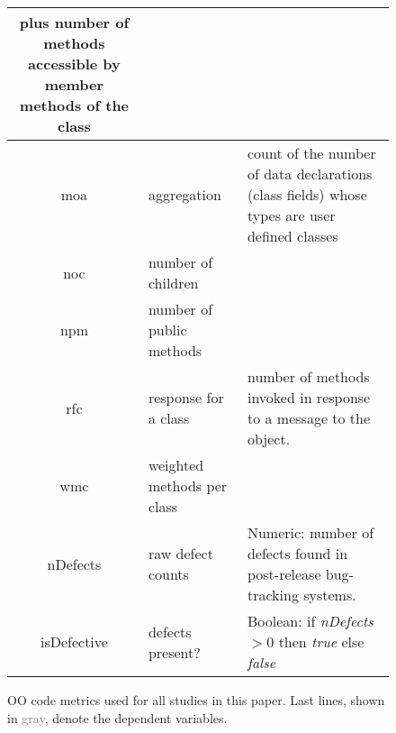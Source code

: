 \begin{figure*}[tb]
\begin{center}
{{\begin{tabular}{c|l|p{4.7in}}
				plus number of methods accessible by member methods of the
				class\\\hline
				moa &  aggregation &  count of the number of data declarations (class
				fields) whose types are user defined classes\\\hline
				noc &  number of children &\\\hline
				npm & number of public methods & \\\hline
				rfc & response for a class &number of  methods invoked in response to
				a message to the object.\\\hline
				wmc & weighted methods per class &\\\hline
				\rowcolor{lightgray}
				nDefects & raw defect counts & Numeric: number of defects found in 
				post-release bug-tracking systems.\\
				\rowcolor{lightgray}
				isDefective & defects present? & Boolean: if {\em nDefects} $>0$ then {\em 
				true} else {\em false}
			\end{tabular}}
			}
	\end{center}
	\caption{OO code metrics used for all studies in this paper.
	   Last lines, shown in \textcolor{gray}{gray}, denote the dependent 
	   variables.}\label{fig:static_metrics}
\end{figure*}